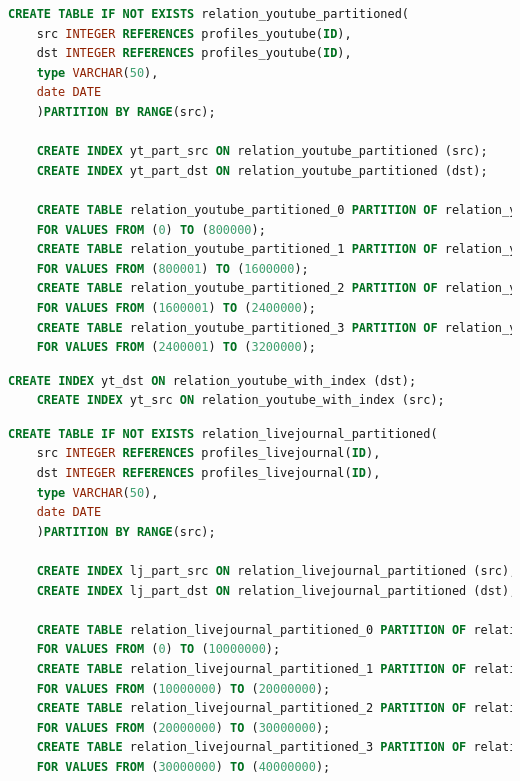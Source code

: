 \begin{lstlisting}[language=SQL,caption=Erstellen von partitionierten Tabellen mit Index youtube,frame=single, label={2.parttableindexyoutube.listing}]
    CREATE TABLE IF NOT EXISTS relation_youtube_partitioned(
    src INTEGER REFERENCES profiles_youtube(ID),
    dst INTEGER REFERENCES profiles_youtube(ID),
    type VARCHAR(50),
    date DATE
    )PARTITION BY RANGE(src);

    CREATE INDEX yt_part_src ON relation_youtube_partitioned (src);
    CREATE INDEX yt_part_dst ON relation_youtube_partitioned (dst);

    CREATE TABLE relation_youtube_partitioned_0 PARTITION OF relation_youtube_partitioned
    FOR VALUES FROM (0) TO (800000);
    CREATE TABLE relation_youtube_partitioned_1 PARTITION OF relation_youtube_partitioned
    FOR VALUES FROM (800001) TO (1600000);
    CREATE TABLE relation_youtube_partitioned_2 PARTITION OF relation_youtube_partitioned
    FOR VALUES FROM (1600001) TO (2400000);
    CREATE TABLE relation_youtube_partitioned_3 PARTITION OF relation_youtube_partitioned
    FOR VALUES FROM (2400001) TO (3200000);
\end{lstlisting}

\begin{lstlisting}[language=SQL,caption=Erstellen von Indexen auf relation Tabelle youtube,frame=single, label={2.indexyoutube.listing}]
    CREATE INDEX yt_dst ON relation_youtube_with_index (dst);
    CREATE INDEX yt_src ON relation_youtube_with_index (src);
\end{lstlisting}

\begin{lstlisting}[language=SQL,caption=Erstellen von partitionierten Tabellen mit Index livejournal,frame=single, label={2.parttableindexlivejournal.listing}]
    CREATE TABLE IF NOT EXISTS relation_livejournal_partitioned(
    src INTEGER REFERENCES profiles_livejournal(ID),
    dst INTEGER REFERENCES profiles_livejournal(ID),
    type VARCHAR(50),
    date DATE
    )PARTITION BY RANGE(src);

    CREATE INDEX lj_part_src ON relation_livejournal_partitioned (src);
    CREATE INDEX lj_part_dst ON relation_livejournal_partitioned (dst);

    CREATE TABLE relation_livejournal_partitioned_0 PARTITION OF relation_livejournal_partitioned
    FOR VALUES FROM (0) TO (10000000);
    CREATE TABLE relation_livejournal_partitioned_1 PARTITION OF relation_livejournal_partitioned
    FOR VALUES FROM (10000000) TO (20000000);
    CREATE TABLE relation_livejournal_partitioned_2 PARTITION OF relation_livejournal_partitioned
    FOR VALUES FROM (20000000) TO (30000000);
    CREATE TABLE relation_livejournal_partitioned_3 PARTITION OF relation_livejournal_partitioned
    FOR VALUES FROM (30000000) TO (40000000);
\end{lstlisting}


